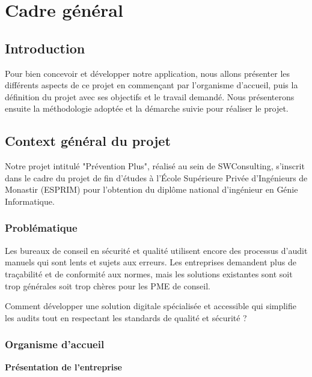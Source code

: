 \chapter{Cadre général}
\begin{spacing}{1.2}
\minitoc
\thispagestyle{MyStyle}
\end{spacing}
\newpage

\section*{Introduction}

\noindent Pour bien concevoir et développer notre application, nous allons présenter les différents aspects de ce projet en commençant par l'organisme d'accueil, puis la définition du projet avec ses objectifs et le travail demandé. Nous présenterons ensuite la méthodologie adoptée et la démarche suivie pour réaliser le projet.

\section{Context général du projet}

\noindent Notre projet intitulé "Prévention Plus", réalisé au sein de SWConsulting, s'inscrit dans le cadre du projet de fin d'études à l'École Supérieure Privée d'Ingénieurs de Monastir (ESPRIM) pour l'obtention du diplôme national d'ingénieur en Génie Informatique.

\subsection{Problématique}

\noindent Les bureaux de conseil en sécurité et qualité utilisent encore des processus d'audit manuels qui sont lents et sujets aux erreurs. Les entreprises demandent plus de traçabilité et de conformité aux normes, mais les solutions existantes sont soit trop générales soit trop chères pour les PME de conseil.

Comment développer une solution digitale spécialisée et accessible qui simplifie les audits tout en respectant les standards de qualité et sécurité ?

\subsection{Organisme d'accueil}

\noindent\large\textbf{Présentation de l'entreprise}\normalsize
\vspace{0.3em}

